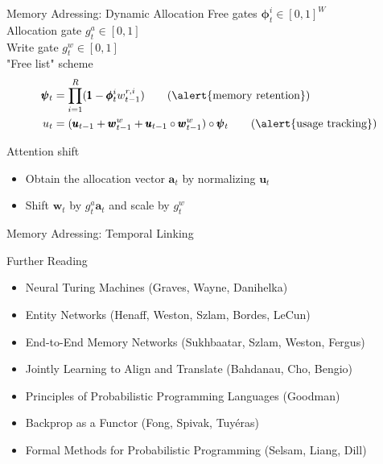 \documentclass{beamer}
\begin{document}
\begin{frame}{Memory Adressing: Dynamic Allocation}
	\alert{Free gates} $\pmb{\phi}_t^i \in [0,1]^W$\\
	\alert{Allocation gate} $g_t^a \in [0,1]$\\
	\alert{Write gate} $g_t^w \in [0,1]$\\
	
	\alert{"Free list" scheme}
	\begin{align*}
	\pmb{\psi}_t &= \prod\limits_{i=1}^R (\pmb{1} - \pmb{\phi}_t^iw_{t-1}^{r,i}) \tag{\alert{memory retention}}\\
	u_t &= (\pmb{u}_{t-1} + \pmb{w}_{t-1}^w + \pmb{u}_{t-1} \circ \pmb{w}_{t-1}^w) \circ \pmb{\psi}_t \tag{\alert{usage tracking}}\\
	\end{align*}
	
	\pause
	\alert{Attention shift} 
	\begin{itemize}
	\item Obtain the \alert{allocation vector} $\pmb{a}_t$ by normalizing $\pmb{u}_t$\\
	\item \alert{Shift} $\pmb{w}_t$ by $g_t^a\pmb{a}_t$ and \alert{scale} by $g_t^w$
	\end{itemize}
\end{frame}

\begin{frame}{Memory Adressing: Temporal Linking}

\end{frame}

\begin{frame}{Further Reading}
	\begin{itemize}
	\item \alert{Neural Turing Machines} (Graves, Wayne, Danihelka)
	\item \alert{Entity Networks} (Henaff, Weston, Szlam, Bordes, LeCun)
	\item \alert{End-to-End Memory Networks} (Sukhbaatar, Szlam, Weston, Fergus)	
	\item \alert{Jointly Learning to Align and Translate} (Bahdanau, Cho, Bengio)
	\item \alert{Principles of Probabilistic Programming Languages} (Goodman)
	\item \alert{Backprop as a Functor} (Fong, Spivak, Tuyéras)
	\item \alert{Formal Methods for Probabilistic Programming} (Selsam, Liang, Dill)
	\end{itemize}
\end{frame}
\end{document}

